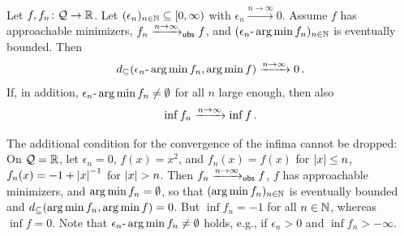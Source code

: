 %
\begin{theorem}\label{thm:alt:convOfMini}
	Let $f,f_n \colon \mathcal{Q}\to\mathbb{R}$. Let $(\epsilon_n)_{n\in\mathbb{N}}\subseteq [0,\infty)$ with $\epsilon_n \xrightarrow{n\to\infty}0$. 
	Assume $f$ has approachable minimizers, $f_n \xrightarrow{n\to\infty}_{\mathsf{ubs}} f$, and $(\epsilon_n\text{-}\operatorname*{arg\,min} f_n)_{n\in\mathbb{N}}$ is eventually bounded.
	Then
	\begin{equation*}
		d_\subseteq(\epsilon_n\text{-}\operatorname*{arg\,min} f_n, \operatorname*{arg\,min} f)\xrightarrow{n\to\infty}
		0
		\, .
	\end{equation*}
	If, in addition, $\epsilon_n\text{-}\operatorname*{arg\,min} f_n \neq \emptyset$ for all $n$ large enough, then also
	\begin{equation*}
		\inf f_n \xrightarrow{n\to\infty} \inf f
		\, .
	\end{equation*}
\end{theorem}
%
\begin{remark}\label{rem:alt:nonempty}
	The additional condition for the convergence of the infima cannot be dropped: On $\mathcal{Q}=\mathbb{R}$, let $\epsilon_n = 0$, $f(x) = x^2$, and $f_n(x) = f(x)$ for $\left| x \right| \leq n$, $f_n(x) = -1 + \left| x \right|^{-1}$ for $\left| x \right| > n$. Then $f_n\xrightarrow{n\to\infty}_{\mathsf{ubs}} f$, $f$ has approachable minimizers, and $\operatorname*{arg\,min} f_n = \emptyset$, so that $(\operatorname*{arg\,min} f_n)_{n\in\mathbb{N}}$ is eventually bounded and $d_\subseteq(\operatorname*{arg\,min} f_n, \operatorname*{arg\,min} f) = 0$. But $\inf f_n = -1$ for all $n\in\mathbb{N}$, whereas $\inf f = 0$.
	Note that $\epsilon_n\text{-}\operatorname*{arg\,min} f_n \neq\emptyset$ holds, e.g., if $\epsilon_n > 0$ and $\inf f_n > -\infty$.
\end{remark}
%
